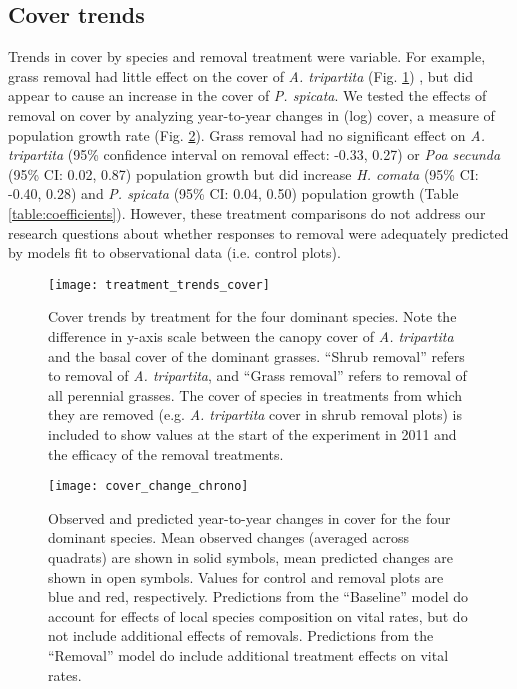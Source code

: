 \documentclass[11pt]{article}
\begin{document}
\begin{doublespacing}
\subsection*{Cover trends}

Trends in cover by species and removal treatment were variable. For example, grass removal had little effect on the cover of \textit{A. tripartita} (Fig. \ref{fig:CoverTrends}) , but did appear to cause an increase in the cover of \textit{P. spicata}. We tested the effects of removal on cover by analyzing year-to-year changes in (log) cover, a measure of population growth rate (Fig. \ref{fig:CoverChange}). Grass removal had no significant effect on \textit{A. tripartita} (95\% confidence interval on removal effect: -0.33, 0.27) or \textit{Poa secunda} (95\% CI: 0.02, 0.87) population growth but did increase \textit{H. comata} (95\% CI: -0.40, 0.28) and \textit{P. spicata} (95\% CI: 0.04, 0.50) population growth (Table \ref{table:coefficients}). However, these treatment comparisons do not address our research questions about whether responses to removal were adequately predicted by models fit to observational data (i.e. control plots).  

\begin{figure}[tbp]
\centering
\texttt{[image: treatment\_trends\_cover]}
\caption{Cover trends by treatment for the four dominant species.  Note the difference in y-axis scale between the canopy cover of \textit{A. tripartita} and the basal cover of the dominant grasses. ``Shrub removal'' refers to removal of \textit{A. tripartita}, and ``Grass removal'' refers to removal of all perennial grasses. The cover of species in treatments from which they are removed (e.g. \textit{A. tripartita} cover in shrub removal plots) is included to show values at the start of the experiment in 2011 and the efficacy of the removal treatments.}
\label{fig:CoverTrends}
\end{figure}


\begin{figure}[tbp]
\centering
\texttt{[image: cover\_change\_chrono]}
\caption{Observed and predicted year-to-year changes in cover for the four dominant species. Mean observed changes (averaged across quadrats) are shown in solid symbols, mean predicted changes are shown in open symbols. Values for control and removal plots are blue and red, respectively. Predictions from the ``Baseline'' model do account for effects of local species composition on vital rates, but do not include additional effects of removals. Predictions from the ``Removal'' model do include additional treatment effects on vital rates. }
\label{fig:CoverChange}
\end{figure}


\end{doublespacing}
\end{document}
